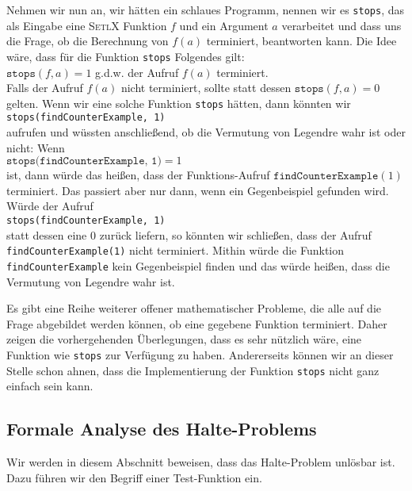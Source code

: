 Nehmen wir nun an, wir h\"{a}tten ein schlaues Programm, nennen wir es \texttt{stops}, das als Eingabe
eine \textsc{SetlX} Funktion $f$ und ein Argument $a$ verarbeitet und dass uns die Frage, ob die Berechnung von $f(a)$
terminiert, beantworten kann.  Die Idee w\"{a}re, dass f\"ur die Funktion \texttt{stops} Folgendes gilt:
\\[0.2cm]
\hspace*{1.3cm}
$\texttt{stops}(f, a) = 1$ \quad g.d.w. \quad der Aufruf $f(a)$ terminiert.
\\[0.2cm]
Falls der Aufruf $f(a)$ nicht terminiert,  sollte statt dessen $\texttt{stops}(f,a) = 0$ gelten.
Wenn wir eine solche Funktion \texttt{stops} h\"{a}tten, dann k\"{o}nnten wir 
\\[0.2cm]
\hspace*{1.3cm}
\texttt{stops(findCounterExample, 1)}
\\[0.2cm]
aufrufen und w\"{u}ssten anschlie\ss{}end, ob die Vermutung von Legendre wahr ist oder nicht:  Wenn
\\[0.2cm]
\hspace*{1.3cm}
$\texttt{stops(findCounterExample, 1)} = 1$
 \\[0.2cm]
ist, dann w\"{u}rde das hei\ss{}en,
dass der Funktions-Aufruf $\texttt{findCounterExample}(1)$ terminiert.  Das passiert aber nur dann,
wenn ein Gegenbeispiel gefunden wird.  W\"{u}rde der Aufruf 
\\[0.2cm]
\hspace*{1.3cm}
\texttt{stops(findCounterExample, 1)}
\\[0.2cm]
statt dessen eine $0$ zur\"{u}ck liefern, so k\"{o}nnten wir schlie\ss{}en, dass der Aufruf \texttt{findCounterExample(1)}
nicht terminiert. Mithin w\"{u}rde die Funktion \texttt{findCounterExample} kein Gegenbeispiel finden und
das w\"{u}rde hei\ss{}en, dass die Vermutung von Legendre wahr ist.

Es gibt eine Reihe weiterer offener  mathematischer Probleme, die alle auf die Frage abgebildet
werden k\"{o}nnen, ob eine gegebene Funktion terminiert.  Daher zeigen die vorhergehenden \"{U}berlegungen,
dass es sehr n\"{u}tzlich w\"{a}re, eine Funktion wie \texttt{stops} zur Verf\"{u}gung zu haben.  Andererseits
k\"{o}nnen wir an dieser Stelle schon ahnen, dass die Implementierung der Funktion \texttt{stops}
nicht ganz einfach sein kann.  

 
\subsection{Formale Analyse des Halte-Problems}
Wir werden in diesem Abschnitt beweisen, dass das Halte-Problem unl\"{o}sbar ist.  Dazu f\"{u}hren
wir den Begriff einer Test-Funktion ein.  


